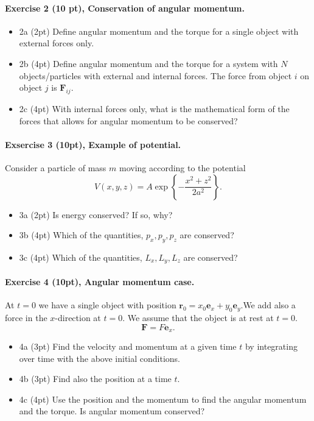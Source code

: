 \documentclass[%
oneside,                 %
final,                   %
10pt]{article}
\begin{document}
\noindent
\paragraph{Exercise 2 (10 pt), Conservation of angular momentum.}
\begin{itemize}
\item 2a (2pt) Define angular momentum and the torque for a single object with external forces only. 

\item 2b (4pt) Define angular momentum and the torque for a system with $N$ objects/particles  with external and internal forces. The force from object $i$ on object $j$ is $\bm{F}_{ij}$.

\item 2c (4pt) With internal forces only, what is the mathematical form of the forces that allows for angular momentum to be conserved? 
\end{itemize}

\noindent
\paragraph{Exsercise 3 (10pt), Example of potential.}
Consider a particle of mass $m$ moving according to the potential
\[
V(x,y,z)=A\exp\left\{-\frac{x^2+z^2}{2a^2}\right\}.
\]

\begin{itemize}
\item 3a (2pt) Is energy conserved? If so, why? 

\item 3b (4pt) Which of  the quantities, $p_x,p_y,p_z$ are conserved?

\item 3c (4pt) Which of  the quantities, $L_x,L_y,L_z$ are conserved?
\end{itemize}

\noindent
\paragraph{Exercise 4 (10pt), Angular momentum case.}
At $t=0$ we have a single object with position $\bm{r}_0=x_0\bm{e}_x+y_0\bm{e}_y$.We add also a force in the $x$-direction at $t=0$. We assume that the object is at rest at $t=0$. 
\[
\bm{F} = F\bm{e}_x.
\]

\begin{itemize}
\item 4a (3pt) Find the velocity and momentum at a given time $t$ by integrating over time with the above initial conditions.

\item 4b (3pt) Find also the position at a time $t$. 

\item 4c (4pt) Use the position and the momentum to find the angular momentum and the torque. Is angular momentum conserved?
\end{itemize}
\end{document}
